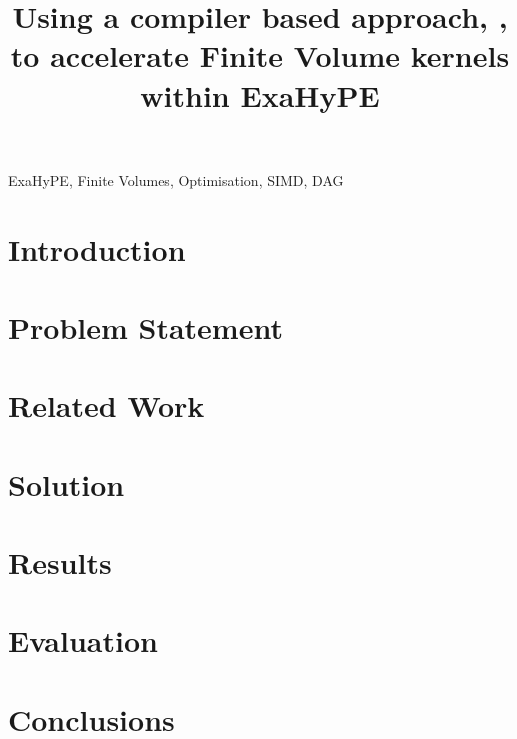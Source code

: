 \documentclass[12pt,a4paper]{article}
\title{Using a compiler based approach, \phlat, to accelerate Finite Volume kernels within ExaHyPE}
\author{} %
\date{}
\newif\iftesting
\newcommand{\testingbreak}{\iftesting \pagebreak \fi}%
\begin{document}
\maketitle

\begin{abstract}

\end{abstract}

\begin{keywords}
ExaHyPE, Finite Volumes, Optimisation, SIMD, DAG
\end{keywords}

\testingbreak
\section{Introduction}


\testingbreak
\section{Problem Statement}\label{sec:problem_statement}


\testingbreak
\section{Related Work}



\testingbreak
\section{Solution}\label{sec:methodology}


%

\testingbreak
\section{Results}\label{sec:results}



\testingbreak
\section{Evaluation}


\testingbreak
\section{Conclusions}


\testingbreak
%
\printbibliography

\iftesting
\pagebreak

\fi
\end{document}
